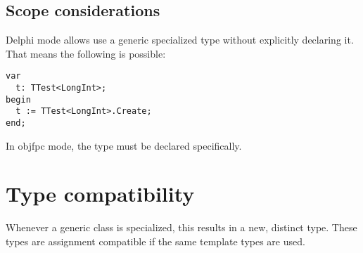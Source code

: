 \subsection{Scope considerations}
Delphi mode allows use a generic specialized type without explicitly declaring it. That means the following is possible:
\begin{verbatim}
var
  t: TTest<LongInt>;
begin
  t := TTest<LongInt>.Create;
end;
\end{verbatim}
In objfpc mode, the type must be declared specifically.

\section{Type compatibility}
Whenever a generic class is specialized, this results in a new, distinct type.
These types are assignment compatible if the same template types are used.

